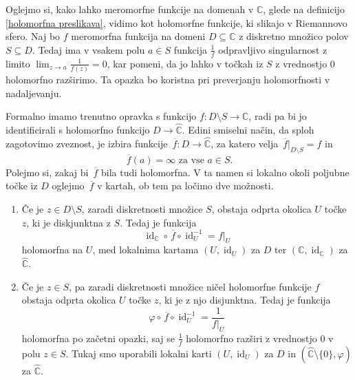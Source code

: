 \documentclass[mat1]{fmfdelo}
\numberwithin{equation}{section}
\newcommand{\C}{\mathbb C}
\newcommand{\RS}{\widehat{\C}}
\newcommand{\inv}{^{-1}}
\newcommand{\olsi}[1]{\,\overline{\!{#1}}} %
\DeclareMathOperator{\id}{id}
\theoremstyle{definition}
\begin{document}

\begin{zgled*}
    \label{meromorfne so holomorfne v R.sfero}
    Oglejmo si, kako lahko meromorfne funkcije na domenah v $\C$, glede na definicijo \ref{holomorfna preslikava}, vidimo kot holomorfne funkcije, ki slikajo v Riemannovo sfero. Naj bo $f$ meromorfna funkcija na domeni $D \subseteq \C$ z diskretno množico polov $S \subseteq D$. Tedaj ima v vsakem polu $a \in S$ funkcija $\frac1f$ odpravljivo singularnost z limito $\lim_{z \to a} \frac{1}{f(z)} = 0$, kar pomeni, da jo lahko v točkah iz $S$ z vrednostjo $0$ holomorfno razširimo. Ta opazka bo koristna pri preverjanju holomorfnosti v nadaljevanju. 
    
    Formalno imamo trenutno opravka s funkcijo $f: D\setminus S \to \C$, radi pa bi jo identificirali s holomorfno funkcijo $D \to \RS$. Edini smiselni način, da sploh zagotovimo zveznost, je izbira funkcije $\olsi{f} : D \to \RS$, za katero velja $\olsi{f}|_{D\setminus S} = f$ in 
    \[
        \olsi{f}(a) = \infty \text{ za vse } a \in S.  
    \]
    Polejmo si, zakaj bi $\olsi{f}$ bila tudi holomorfna. V ta namen si lokalno okoli poljubne točke iz $D$ oglejmo $\olsi{f}$ v kartah, ob tem pa ločimo dve možnosti.
    \begin{enumerate}
        \item Če je $z \in D\setminus S$, zaradi diskretnosti množice $S$, obstaja odprta okolica $U$ točke $z$, ki je diskjunktna z $S$. Tedaj je funkcija
        \[
            \id_\C \circ \olsi{f} \circ \id_U\inv = f|_U  
        \]
        holomorfna na $U$, med lokalnima kartama $(U, \id_U)$ za $D$ ter $(\C, \id_\C)$ za $\RS$.
        
        \item Če je $z \in S$, pa zaradi diskretnosti množice ničel holomorfne funkcije $f$ obstaja odprta okolica $U$ točke $z$, ki je z njo disjunktna. Tedaj je funkcija
        \[
            \varphi \circ \olsi{f} \circ \id_U\inv = \frac{1}{f|_U}
        \]
        holomorfna po začetni opazki, saj se $\frac{1}{f}$ holomorfno razširi z vrednostjo $0$ v polu $z \in S$. Tukaj smo uporabili lokalni karti $(U, \id_U)$ za $D$ in $(\RS \setminus \{0\}, \varphi)$ za $\RS$.
    \end{enumerate}



\end{zgled*}
\end{document}
